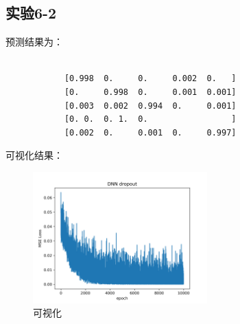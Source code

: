 \documentclass{../source/Experiment}
\begin{document}
\subsection{实验6-2}
预测结果为：
\begin{lstlisting}

            [0.998  0.     0.     0.002  0.   ]
            [0.     0.998  0.     0.001  0.001]
            [0.003  0.002  0.994  0.     0.001]
            [0. 0.  0. 1.  0.                 ]
            [0.002  0.     0.001  0.     0.997]

            \end{lstlisting}
可视化结果：
\begin{figure}[H]
    \centering
    \includegraphics[width = 0.6\textwidth]{Part6/6_2.png}
    \caption{可视化}
\end{figure}
\end{document}
